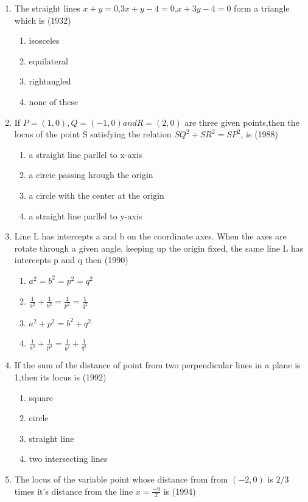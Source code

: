 \documentclass[12pt]{article}
\begin{document}
\begin{enumerate}
\item The straight lines $x+y=0$,$3x+y-4=0$,$x+3y-4=0$ form a triangle which is (1932)
\begin{enumerate}
\item isosceles
\item equilateral
\item rightangled
\item none of these
\end{enumerate}
\item If $P=(1,0),Q=(-1,0) and R=(2,0)$ are three given points,then the locus of the point S satisfying the relation $SQ^2+SR^2=SP^2$, is (1988)
\begin{enumerate}
\item a straight line parllel to x-axis  
\item a circie passing hrough the origin 
\item a circle with the center at the origin 
\item a straight line parllel to y-axis
\end{enumerate}
\item Line L has intercepts a and b on the coordinate axes. When the axes are rotate through a given angle, keeping up the origin fixed, the same line L has intercepts  p and q then (1990)\\
\begin{enumerate}
\item $a^2=b^2=p^2=q^2$ 
\item $\frac{1}{a^2} +\frac{1}{b^2}=\frac{1}{p^2}=\frac{1}{q^2}$ 
\item $a^2+p^2=b^2+q^2$ 
\item $\frac{1}{a^2}+\frac{1}{p^2}=\frac{1}{b^2}+\frac{1}{q^2}$
\end{enumerate}
\item If the sum of the distance of point from two perpendicular lines in a plane is 1,then its locus is (1992)\\
\begin{enumerate}
\item square 
\item circle 
\item straight line  
\item two intersecting lines
\end{enumerate}
\item The locus of the variable point whose distance from from $(-2,0)$ is $2/3$ times it's distance from the line $x= \frac{-9}{2}$ is (1994)
\begin{enumerate}

\end{enumerate}
\end{enumerate}
\end{document}
